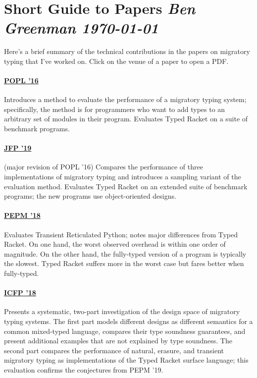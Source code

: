 \documentclass[10pt]{article}
\begin{document}

\nolinenumbers

\section*{Short Guide to Papers \hfill{\normalfont\small\it Ben Greenman \quad \today}}

Here's a brief summary of the technical contributions in the papers on
migratory typing that I've worked on.
Click on the venue of a paper to open a PDF.

\bigskip
\hfill{}\decoone\hfill{}

\paragraph{\href{https://www2.ccs.neu.edu/racket/pubs/popl16-tfgnvf.pdf}{POPL '16}}
Introduces a method to evaluate the performance of a migratory typing system;
specifically, the method is for programmers who want to add types to an
arbitrary set of modules in their program.
Evaluates Typed Racket on a suite of benchmark programs.


\paragraph{\href{https://www2.ccs.neu.edu/racket/pubs/gtnffvf-jfp19.pdf}{JFP '19}}
(major revision of POPL '16) \quad
Compares the performance of three implementations of migratory typing and
introduces a sampling variant of the evaluation method.
Evaluates Typed Racket on an extended suite of benchmark programs; the new programs use
object-oriented designs.


\paragraph{\href{https://www2.ccs.neu.edu/racket/pubs/pepm18-gm.pdf}{PEPM '18}}
Evaluates Transient Reticulated Python; notes major differences from Typed
Racket.
On one hand, the worst observed overhead is within one order of
magnitude.
On the other hand, the fully-typed version of a program is
typically the slowest.
Typed Racket suffers more in the worst case but fares
better when fully-typed.


\paragraph{\href{https://www2.ccs.neu.edu/racket/pubs/icfp18-gf.pdf}{ICFP '18}}
Presents a systematic, two-part investigation of the design space of migratory
typing systems.
The first part models different designs as different semantics
for a common mixed-typed language, compares their type soundness guarantees,
and present additional examples that are not explained by type soundness. The
second part compares the performance of natural, erasure, and transient
migratory typing as implementations of the Typed Racket surface language; this
evaluation confirms the conjectures from PEPM '19.
\end{document}

